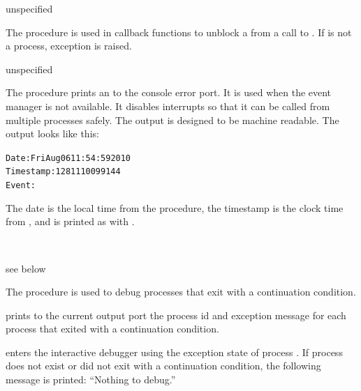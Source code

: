 \begin{procedure}
\end{procedure}
\returns{} unspecified

The  procedure is used in callback functions to
unblock a  from a call to . If
 is not a process, exception  is raised.

\begin{procedure}
\end{procedure}
\returns{} unspecified

The  procedure prints an  to
the console error port. It is used when the event manager is not
available. It disables interrupts so that it can be called from
multiple processes safely.  The output is designed to be machine
readable. The output looks like this:

\begin{alltt}
Date: Fri Aug 06 11:54:59 2010
Timestamp: 1281110099144
Event: 
\end{alltt}

The date is the local time from the  procedure,
the timestamp is the clock time from , and
 is printed as with .

\begin{procedure}
  \\
\end{procedure}
\returns{} see below

The  procedure is used to debug processes that exit with a
continuation condition.

 prints to the current output port the process id and
exception message for each process that exited with a continuation
condition.

 enters the interactive debugger using the
exception state of process . If process  does not
exist or did not exit with a continuation condition, the following
message is printed: ``Nothing to debug.''

